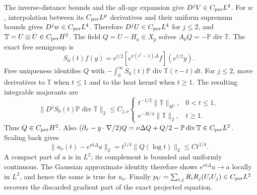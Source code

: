 The inverse-distance bounds and the all-age expansion give
$D^jV\in C_{\rm per}L^4$. For $w$, interpolation between its
$C_{\rm per}L^p$ derivatives and their uniform supremum bounds gives
$D^jw\in C_{\rm per}L^4$. Therefore
$D^jU\in C_{\rm per}L^4$ for $j\le2$, and
$\mathbb T=U\otimes U\in C_{\rm per}H^2$. The field
$Q=U-H_a\in X_p$ solves $A_0Q=-\mathbb P\operatorname{div}\mathbb T$.
The exact free semigroup is
\[
 S_0(t)f(y)=e^{t/2}[e^{\nu(e^t-1)\Delta}f](e^{t/2}y).
\]
Free uniqueness identifies $Q$ with
$-\int_0^\infty S_0(t)\mathbb P\operatorname{div}\mathbb T(\tau-t)dt$.
For $j\le2$, move derivatives to $\mathbb T$ when $t\le1$ and to
the heat kernel when $t\ge1$. The resulting integrable majorants are
\[
 \|D^jS_0(t)\mathbb P\operatorname{div}\mathbb T\|_2
 \le C_{j,\nu}
 \begin{cases}t^{-1/2}\|\mathbb T\|_{H^j},&0<t\le1,\\
 e^{-3t/4}\|\mathbb T\|_2,&t\ge1.
 \end{cases}
\]
Thus $Q\in C_{\rm per}H^2$. Also
$(\partial_\tau-y\cdot\nabla/2)Q
=\nu\Delta Q+Q/2-\mathbb P\operatorname{div}\mathbb T
\in C_{\rm per}L^2$. Scaling back gives
\[
 \|u_\nu(t)-e^{\nu t\Delta}a\|_2
       =t^{1/4}\|Q(\log t)\|_2\le C t^{1/4}.
\]
A compact part of $a$ is in $L^2$; its complement is bounded and
uniformly continuous. The Gaussian approximate identity therefore
shows $e^{\nu t\Delta}a\to a$ locally in $L^2$, and hence the same
is true for $u_\nu$. Finally
$p_U=\sum_{i,j}R_iR_j(U_iU_j)\in C_{\rm per}L^2$ recovers the
discarded gradient part of the exact projected equation.
